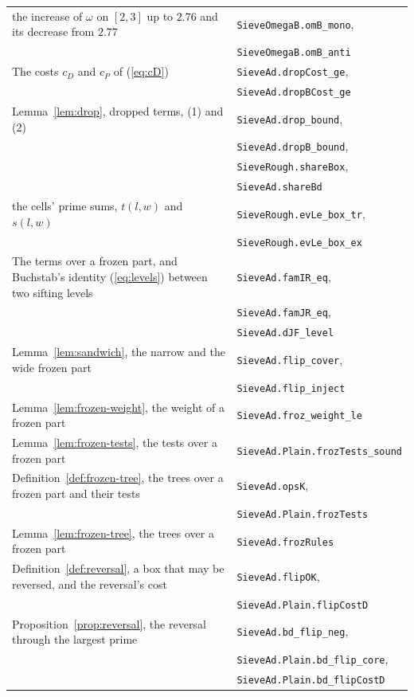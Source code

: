 \documentclass[11pt]{article}
\theoremstyle{definition}
\newcommand{\lean}[1]{\texttt{#1}}
\begin{document}
{\begin{longtable}{@{}>{\raggedright\arraybackslash}p{}l@{}}
\quad the increase of $\omega$ on $[2, 3]$ up to $2.76$ and its decrease from $2.77$ & \lean{SieveOmegaB.omB\_mono}, \\
 & \lean{SieveOmegaB.omB\_anti} \\
The costs $c_D$ and $c_P$ of (\ref{eq:cD}) & \lean{SieveAd.dropCost\_ge}, \\
 & \lean{SieveAd.dropBCost\_ge} \\
Lemma~\ref{lem:drop}, dropped terms, (1) and (2) & \lean{SieveAd.drop\_bound}, \\
 & \lean{SieveAd.dropB\_bound}, \\
 & \lean{SieveRough.shareBox}, \\
 & \lean{SieveAd.shareBd} \\
\quad the cells' prime sums, $t(l, w)$ and $s(l, w)$ & \lean{SieveRough.evLe\_box\_tr}, \\
 & \lean{SieveRough.evLe\_box\_ex} \\
The terms over a frozen part, and Buchstab's identity (\ref{eq:levels}) between two sifting levels &
\lean{SieveAd.famIR\_eq}, \\
 & \lean{SieveAd.famJR\_eq}, \\
 & \lean{SieveAd.dJF\_level} \\
Lemma~\ref{lem:sandwich}, the narrow and the wide frozen part & \lean{SieveAd.flip\_cover}, \\
 & \lean{SieveAd.flip\_inject} \\
Lemma~\ref{lem:frozen-weight}, the weight of a frozen part & \lean{SieveAd.froz\_weight\_le} \\
Lemma~\ref{lem:frozen-tests}, the tests over a frozen part & \lean{SieveAd.Plain.frozTests\_sound} \\
Definition~\ref{def:frozen-tree}, the trees over a frozen part and their tests & \lean{SieveAd.opsK}, \\
 & \lean{SieveAd.Plain.frozTests} \\
Lemma~\ref{lem:frozen-tree}, the trees over a frozen part & \lean{SieveAd.frozRules} \\
Definition~\ref{def:reversal}, a box that may be reversed, and the reversal's cost & \lean{SieveAd.flipOK}, \\
 & \lean{SieveAd.Plain.flipCostD} \\
Proposition~\ref{prop:reversal}, the reversal through the largest prime & \lean{SieveAd.bd\_flip\_neg}, \\
 & \lean{SieveAd.Plain.bd\_flip\_core}, \\
 & \lean{SieveAd.Plain.bd\_flipCostD} \\

\end{longtable}}
\end{document}
